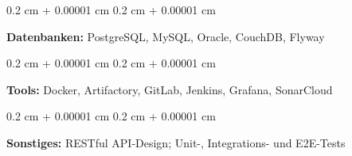 \documentclass[11pt, letterpaper]{article}
\newenvironment{onecolentry}{
    \begin{adjustwidth}{
        0.2 cm + 0.00001 cm
    }{
        0.2 cm + 0.00001 cm
    }
}{
    \end{adjustwidth}
} %
\begin{document}
    \begin{onecolentry}
        \textbf{Datenbanken:} PostgreSQL, MySQL, Oracle, CouchDB, Flyway
    \end{onecolentry}
    
    \vspace{0.2cm}
    
    \begin{onecolentry}
        \textbf{Tools:} Docker, Artifactory, GitLab, Jenkins, Grafana, SonarCloud
    \end{onecolentry}
    
    \vspace{0.2cm}
    
    \begin{onecolentry}
        \textbf{Sonstiges:} RESTful API-Design; Unit-, Integrations- und E2E-Tests
    \end{onecolentry}
    
\end{document}
